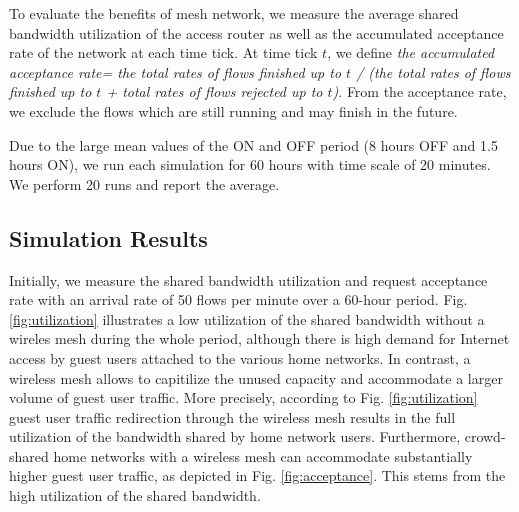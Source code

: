 To evaluate the benefits of mesh network, we measure the average shared bandwidth utilization of the access router as well as the accumulated acceptance rate of the network at each time tick. At time tick $t$, we define \emph{the accumulated acceptance rate= the total rates of flows finished up to $t$ / (the total rates of flows finished up to $t$ + total rates of flows rejected up to $t$)}.
From the acceptance rate, we exclude the flows which are still running and may finish in the future.

Due to the large mean values of the ON and OFF period (8 hours OFF and 1.5 hours ON), we run each simulation for 60 hours with time scale of 20 minutes. We perform 20 runs and report the average.

\subsection{Simulation Results}
\label{evaluation:results}

Initially, we measure the shared bandwidth utilization and request acceptance rate with an arrival rate of 50 flows per minute over a 60-hour period. Fig. \ref{fig:utilization} illustrates a low utilization of the shared bandwidth without a wireles mesh during the whole period, although there is high demand for Internet access by guest users attached to the various home networks. In contrast, a wireless mesh allows to capitilize the unused capacity and accommodate a larger volume of guest user traffic. More precisely, according to Fig. \ref{fig:utilization} guest user traffic redirection through the wireless mesh results in the full utilization of the bandwidth shared by home network users. Furthermore, crowd-shared home networks with a wireless mesh can accommodate substantially higher guest user traffic, as depicted in Fig. \ref{fig:acceptance}. This stems from the high utilization of the shared bandwidth.

